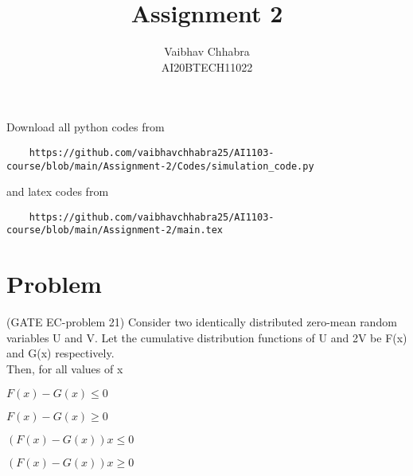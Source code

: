 \documentclass[journal,12pt,twocolumn]{IEEEtran}
\begin{document}
     \def\topbox#1{\raisebox{-\baselineskip}[0in][0in]{#1}}
     \def\midbox#1{\raisebox{-0.5\baselineskip}[0in][0in]{#1}}
\vspace{3cm}
\title{Assignment 2}
\author{Vaibhav Chhabra \\ AI20BTECH11022}
\maketitle
\newpage
\bigskip
\renewcommand{\thefigure}{\theenumi}
\renewcommand{\thetable}{\theenumi}
Download all python codes from 
\begin{lstlisting}
    https://github.com/vaibhavchhabra25/AI1103-course/blob/main/Assignment-2/Codes/simulation_code.py
\end{lstlisting}
and latex codes from 
\begin{lstlisting}
    https://github.com/vaibhavchhabra25/AI1103-course/blob/main/Assignment-2/main.tex
\end{lstlisting}
\section{Problem}
(GATE EC-problem 21)
Consider two identically distributed zero-mean random variables U and V. Let the cumulative distribution functions of U and 2V be F(x) and G(x) respectively. \\
Then, for all values of x

\begin{enumerate}
\begin{multicols}{2}
    \item $F(x)-G(x) \leq 0$
    \item $F(x)-G(x) \geq 0$
    \item $(F(x)-G(x))x \leq 0$
    \item $(F(x)-G(x))x \geq 0$
\end{multicols}
\end{enumerate}
\end{document}
